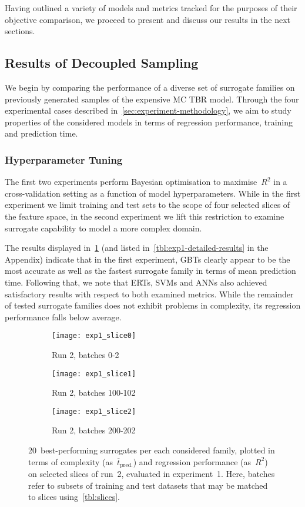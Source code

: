 Having outlined a variety of models and metrics tracked for the
purposes of their objective comparison, we proceed to present and discuss our
results in the next sections.


\subsection{Results of Decoupled Sampling}
\label{sec:modelres}

We begin by comparing the performance of a diverse set of surrogate families on previously generated samples of the expensive MC TBR model.
Through the four experimental cases described
in~\cref{sec:experiment-methodology}, we aim to study properties of the
considered models in terms of regression performance, training and prediction
time.


\subsubsection{Hyperparameter Tuning}

The first two experiments perform Bayesian optimisation to maximise~$R^2$ in
a cross-validation setting as a function of model hyperparameters. While in the
first experiment we limit training and test sets to the scope of four selected
slices of the feature space, in the second experiment we lift this restriction
to examine surrogate capability to model a more complex domain.

The results displayed in~\cref{fig:exp1-time-vs-reg} (and listed
in~\cref{tbl:exp1-detailed-results} in the Appendix) indicate that in the first
experiment, GBTs clearly appear to be the most accurate as
well as the fastest surrogate family in terms of mean prediction time. Following
that, we note that ERTs, SVMs and ANNs also achieved satisfactory results with respect to both examined metrics.
While the remainder of tested surrogate families does not exhibit problems in
complexity, its regression performance falls below average.

\begin{figure}[h]
	\centering
	\begin{subfigure}[b]{0.333\textwidth}
		\centering
		\texttt{[image: exp1\_slice0]}
		\caption{Run 2, batches 0-2}
	\end{subfigure}\hfill%
	\begin{subfigure}[b]{0.333\textwidth}
		\centering
		\texttt{[image: exp1\_slice1]}
		\caption{Run 2, batches 100-102}
	\end{subfigure}\hfill%
	\begin{subfigure}[b]{0.333\textwidth}
		\centering
		\texttt{[image: exp1\_slice2]}
		\caption{Run 2, batches 200-202}
	\end{subfigure}
	\caption{20~best-performing surrogates per each considered family, plotted in
		terms of complexity (as~$\overline{t}_{\text{pred.}}$) and regression
		performance (as~$R^2$) on selected slices of run~2, evaluated in
	experiment~1. Here, batches refer to subsets of training and test datasets that
	may be matched to slices using~\cref{tbl:slices}.}
	\label{fig:exp1-time-vs-reg}
\end{figure}

